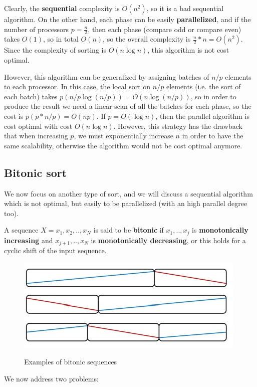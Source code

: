 Clearly, the \textbf{sequential} complexity is $O(n^2)$, so it is a bad sequential algorithm. On the other hand, each phase can be easily \textbf{parallelized}, and if the number of processors $p = \frac{n}{2}$, then each phase (compare odd or compare even) takes $O(1)$, so in total $O(n)$, so the overall complexity is $\frac{n}{2} * n = O(n^2)$. Since the complexity of sorting is $O(n \log n)$, this algorithm is not cost optimal.

However, this algorithm can be generalized by assigning batches of $n/p$ elements to each processor. In this case, the local sort on $n/p$ elements (i.e. the sort of each batch) takes $p (n/p \log (n/p)) = O(n \log (n/p))$, so in order to produce the result we need a linear scan of all the batches for each phase, so the cost is $p (p * n/p) = O(np)$. If $p = O(\log n)$, then the parallel algorithm is cost optimal with cost $O(n \log n)$. However, this strategy has the drawback that when increasing $p$, we must exponentially increase $n$ in order to have the same scalability, otherwise the algorithm would not be cost optimal anymore.

\subsection{Bitonic sort}
We now focus on another type of sort, and we will discuss a sequential algorithm which is not optimal, but easily to be parallelized (with an high parallel degree too).

A sequence $X = x_1, x_2, .., x_N$ is said to be \textbf{bitonic} if $x_1, .., x_j$ is \textbf{monotonically increasing} and $x_{j+1}, .., x_N$ is \textbf{monotonically decreasing}, or this holds for a cyclic shift of the input sequence.

\begin{figure}[h!]
		\centering
		\includegraphics[scale = 2.0]{img/bitonic sequence.jpg}
        \label{bitonic seq}
        \caption{Examples of bitonic sequences}
\end{figure}

We now address two problems:

